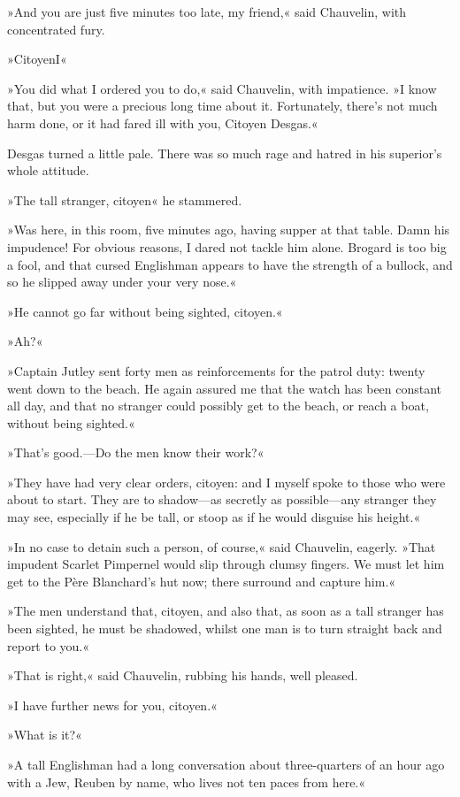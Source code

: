 »And you are just five minutes too late, my friend,« said Chauvelin, with concentrated fury.

»Citoyen\textellipsis \allowbreak  I\textellipsis«

»You did what I ordered you to do,« said Chauvelin, with impatience. »I know that, but you were a precious long time about it. Fortunately, there's not much harm done, or it had fared ill with you, Citoyen Desgas.«

Desgas turned a little pale. There was so much rage and hatred in his superior's whole attitude.

»The tall stranger, citoyen\longdash« he stammered.

»Was here, in this room, five minutes ago, having supper at that table. Damn his impudence! For obvious reasons, I dared not tackle him alone. Brogard is too big a fool, and that cursed Englishman appears to have the strength of a bullock, and so he slipped away under your very nose.«

»He cannot go far without being sighted, citoyen.«

»Ah?«

»Captain Jutley sent forty men as reinforcements for the patrol duty: twenty went down to the beach. He again assured me that the watch has been constant all day, and that no stranger could possibly get to the beach, or reach a boat, without being sighted.«

»That's good.—Do the men know their work?«

»They have had very clear orders, citoyen: and I myself spoke to those who were about to start. They are to shadow—as secretly as possible—any stranger they may see, especially if he be tall, or stoop as if he would disguise his height.«

»In no case to detain such a person, of course,« said Chauvelin, eagerly. »That impudent Scarlet Pimpernel would slip through clumsy fingers. We must let him get to the Père Blanchard's hut now; there surround and capture him.«

»The men understand that, citoyen, and also that, as soon as a tall stranger has been sighted, he must be shadowed, whilst one man is to turn straight back and report to you.«

»That is right,« said Chauvelin, rubbing his hands, well pleased.

»I have further news for you, citoyen.«

»What is it?«

»A tall Englishman had a long conversation about three-quarters of an hour ago with a Jew, Reuben by name, who lives not ten paces from here.«

